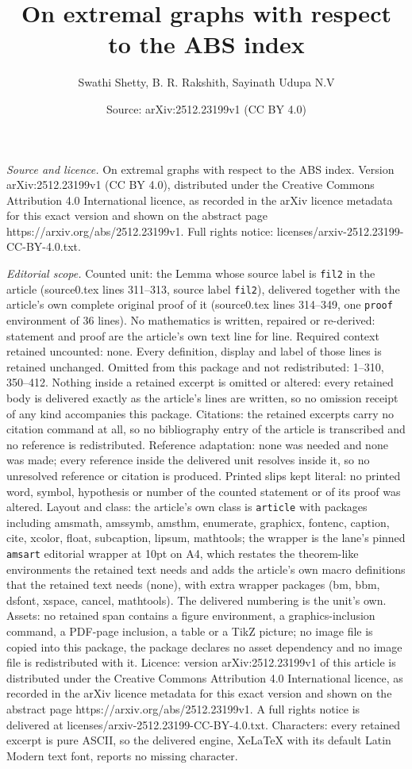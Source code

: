 \documentclass[10pt,a4paper]{amsart}
\title[On extremal graphs with respect to the ABS index]{On extremal graphs with respect to the ABS index}
\author{Swathi Shetty, B. R. Rakshith, Sayinath Udupa N.V}
\date{Source: arXiv:2512.23199v1 (CC BY 4.0)}
\begin{document}
\maketitle

\noindent\emph{Source and licence.} On extremal graphs with respect to the ABS index. Version arXiv:2512.23199v1 (CC BY 4.0), distributed under the Creative Commons Attribution 4.0 International licence, as recorded in the arXiv licence metadata for this exact version and shown on the abstract page https://arxiv.org/abs/2512.23199v1. Full rights notice: licenses/arxiv-2512.23199-CC-BY-4.0.txt.\par\smallskip

\noindent\textit{Editorial scope.} Counted unit: the Lemma whose source label is \texttt{fil2} in the article (source0.tex lines 311--313, source label \texttt{fil2}), delivered together with the article's own complete original proof of it (source0.tex lines 314--349, one \texttt{proof} environment of 36 lines). No mathematics is written, repaired or re-derived: statement and proof are the article's own text line for line. Required context retained uncounted: none. Every definition, display and label of those lines is retained unchanged. Omitted from this package and not redistributed: 1--310, 350--412. Nothing inside a retained excerpt is omitted or altered: every retained body is delivered exactly as the article's lines are written, so no omission receipt of any kind accompanies this package. Citations: the retained excerpts carry no citation command at all, so no bibliography entry of the article is transcribed and no reference is redistributed. Reference adaptation: none was needed and none was made; every reference inside the delivered unit resolves inside it, so no unresolved reference or citation is produced. Printed slips kept literal: no printed word, symbol, hypothesis or number of the counted statement or of its proof was altered. Layout and class: the article's own class is \texttt{article} with packages including amsmath, amssymb, amsthm, enumerate, graphicx, fontenc, caption, cite, xcolor, float, subcaption, lipsum, mathtools; the wrapper is the lane's pinned \texttt{amsart} editorial wrapper at 10pt on A4, which restates the theorem-like environments the retained text needs and adds the article's own macro definitions that the retained text needs (none), with extra wrapper packages (bm, bbm, dsfont, xspace, cancel, mathtools). The delivered numbering is the unit's own. Assets: no retained span contains a figure environment, a graphics-inclusion command, a PDF-page inclusion, a table or a TikZ picture; no image file is copied into this package, the package declares no asset dependency and no image file is redistributed with it. Licence: version arXiv:2512.23199v1 of this article is distributed under the Creative Commons Attribution 4.0 International licence, as recorded in the arXiv licence metadata for this exact version and shown on the abstract page https://arxiv.org/abs/2512.23199v1. A full rights notice is delivered at licenses/arxiv-2512.23199-CC-BY-4.0.txt. Characters: every retained excerpt is pure ASCII, so the delivered engine, XeLaTeX with its default Latin Modern text font, reports no missing character.
\end{document}
